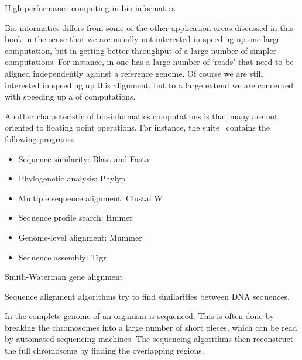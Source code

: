 
 {High performance computing in bio-informatics}

Bio-informatics differs from some of the other application areas
discussed in this book in the sense that we are usually not interested
in speeding up one large computation, but in getting better throughput
of a large number of simpler computations. For instance, in
 one has a large number of `reads' that need
to be aligned independently against a reference genome. Of course we
are still interested in speeding up this alignment, but to a large
extend we are concerned with speeding up a
 of computations.

Another characteristic of bio-informatics computations is that many
are not oriented to floating point operations. For instance, the
 suite~\cite{biobench:ieee} contains the following programs:
\begin{itemize}
\item Sequence similarity: Blast and Fasta
\item Phylogenetic analysis: Phylyp
\item Multiple sequence alignment: Clustal W
\item Sequence profile search: Hmmer
\item Genome-level alignment: Mummer
\item Sequence assembly: Tigr
\end{itemize}

 {Smith-Waterman gene alignment}

Sequence alignment algorithms try to find similarities between 
DNA sequences.

In  the complete genome of an 
organism is sequenced. This is often done by breaking the chromosomes
into a large number of short pieces, which can be read by automated
sequencing machines. The sequencing algorithms then reconstruct
the full chromosome by finding the overlapping regions.

